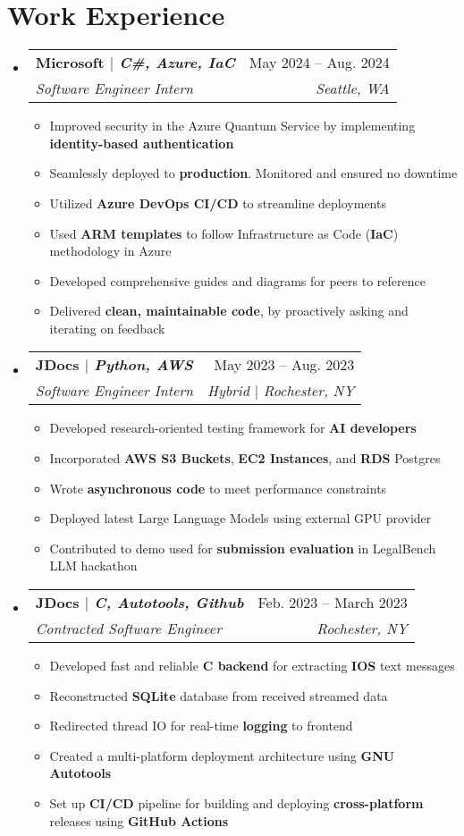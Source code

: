\documentclass[letterpaper,11pt]{article}
\makeatletter
\newcommand{\resumeItem}[1]{
  \item\small{
    {#1 \vspace{-2pt}}
  }
}
\newcommand{\resumeSubheading}[4]{
  \vspace{-2pt}\item
    \begin{tabular*}{0.97\textwidth}[t]{l@{\extracolsep{\fill}}r}
      \textbf{#1} & #2 \\
      \textit{\small#3} & \textit{\small #4} \\
    \end{tabular*}\vspace{-7pt}
}
\newcommand{\resumeSubHeadingListStart}{\begin{itemize}[leftmargin=0.15in, label={}]}
\newcommand{\resumeSubHeadingListEnd}{\end{itemize}}
\newcommand{\resumeItemListStart}{\begin{itemize}}
\newcommand{\resumeItemListEnd}{\end{itemize}\vspace{-5pt}}
\makeatother
\begin{document}
\section{Work Experience}
\resumeSubHeadingListStart
    \resumeSubheading
    {\textbf{Microsoft} $|$ \normalfont \emph{C\#, Azure, IaC}}
        { May 2024 -- Aug. 2024}
        {Software Engineer Intern}{ Seattle, WA}
    \resumeItemListStart
        \resumeItem{Improved security in the Azure Quantum Service by implementing \textbf{identity-based authentication}}
        \resumeItem{Seamlessly deployed to \textbf{production}. Monitored and ensured no downtime}
        \resumeItem{Utilized \textbf{Azure DevOps CI/CD} to streamline deployments}
        \resumeItem{Used \textbf{ARM templates} to follow Infrastructure as Code (\textbf{IaC}) methodology in Azure}
        \resumeItem{Developed comprehensive guides and diagrams for peers to reference}
        \resumeItem{Delivered \textbf{clean, maintainable code}, by proactively asking and iterating on feedback}
    \resumeItemListEnd
    \resumeSubheading
    {\textbf{JDocs} $|$ \normalfont \emph{Python, AWS}}
        { May 2023 -- Aug. 2023}
        {Software Engineer Intern}{ Hybrid $|$ Rochester, NY}
    \resumeItemListStart
    \resumeItem{Developed research-oriented testing framework for \textbf{AI developers}}
        \resumeItem{Incorporated \textbf{AWS S3 Buckets}, \textbf{EC2 Instances}, and \textbf{RDS} Postgres}
        \resumeItem{Wrote \textbf{asynchronous code} to meet performance constraints}
        \resumeItem{Deployed latest Large Language Models using external GPU provider}
        \resumeItem{Contributed to demo used for \textbf{submission evaluation} in LegalBench LLM hackathon}
    \resumeItemListEnd
    \resumeSubheading
        {\textbf{JDocs} $|$ \normalfont \emph{C, Autotools, Github}}
        { Feb. 2023 -- March 2023}
        {Contracted Software Engineer}{ Rochester, NY}
    \resumeItemListStart
        \resumeItem{Developed fast and reliable \textbf{C backend} for extracting \textbf{IOS} text messages}
        \resumeItem{Reconstructed \textbf{SQLite} database from received streamed data}
        \resumeItem{Redirected thread IO for real-time \textbf{logging} to frontend}
        \resumeItem{Created a multi-platform deployment architecture using \textbf{GNU Autotools}}
        \resumeItem{Set up \textbf{CI/CD} pipeline for building and deploying \textbf{cross-platform} releases using \textbf{GitHub Actions}}
    \resumeItemListEnd
\resumeSubHeadingListEnd
\vspace{-17pt}
\end{document}
